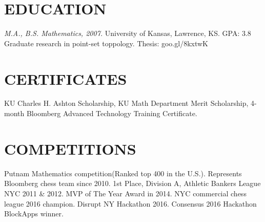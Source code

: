 \documentclass[margin]{res}
\begin{document}
\begin{resume}
\section{EDUCATION} 
		{\sl M.A., B.S. Mathematics, 2007. } University of Kansas, Lawrence, KS. GPA: 3.8  \\
		    Graduate research in point-set toppology. Thesis: goo.gl/8kxtwK
\section{CERTIFICATES} 
            KU Charles H. Ashton Scholarship, KU Math Department Merit Scholarship, 4-month Bloomberg Advanced Technology Training Certificate.
\section{COMPETITIONS}
         Putnam Mathematics competition(Ranked top 400 in the U.S.). Represents Bloomberg chess team since 2010. 1st Place, Division A, Athletic Bankers League NYC 2011 \& 2012. MVP of The Year Award in 2014. NYC commercial chess league 2016 champion. Disrupt NY Hackathon 2016. Consensus 2016 Hackathon BlockApps winner.
\end{resume}
\end{document}
